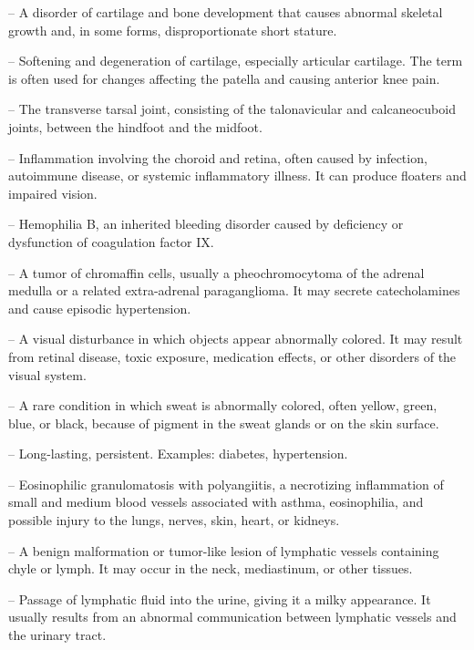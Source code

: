 -- A disorder of cartilage and bone development that causes abnormal skeletal growth and, in some forms, disproportionate short stature.

-- Softening and degeneration of cartilage, especially articular cartilage. The term is often used for changes affecting the patella and causing anterior knee pain.

-- The transverse tarsal joint, consisting of the talonavicular and calcaneocuboid joints, between the hindfoot and the midfoot.

-- Inflammation involving the choroid and retina, often caused by infection, autoimmune disease, or systemic inflammatory illness. It can produce floaters and impaired vision.

-- Hemophilia B, an inherited bleeding disorder caused by deficiency or dysfunction of coagulation factor IX.

-- A tumor of chromaffin cells, usually a pheochromocytoma of the adrenal medulla or a related extra-adrenal paraganglioma. It may secrete catecholamines and cause episodic hypertension.

-- A visual disturbance in which objects appear abnormally colored. It may result from retinal disease, toxic exposure, medication effects, or other disorders of the visual system.

-- A rare condition in which sweat is abnormally colored, often yellow, green, blue, or black, because of pigment in the sweat glands or on the skin surface.

-- Long-lasting, persistent. Examples: diabetes, hypertension.


-- Eosinophilic granulomatosis with polyangiitis, a necrotizing inflammation of small and medium blood vessels associated with asthma, eosinophilia, and possible injury to the lungs, nerves, skin, heart, or kidneys.

-- A benign malformation or tumor-like lesion of lymphatic vessels containing chyle or lymph. It may occur in the neck, mediastinum, or other tissues.

-- Passage of lymphatic fluid into the urine, giving it a milky appearance. It usually results from an abnormal communication between lymphatic vessels and the urinary tract.

